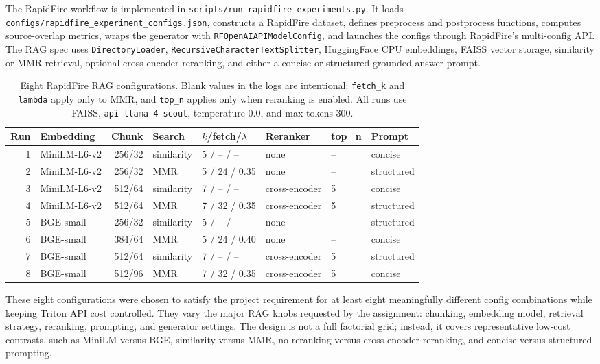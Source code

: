 \documentclass[11pt,twocolumn]{article}
\newcommand{\code}[1]{\texttt{\footnotesize #1}}
\begin{document}
The RapidFire workflow is implemented in \code{scripts/run\_rapidfire\_experiments.py}. It loads \code{configs/rapidfire\_experiment\_configs.json}, constructs a RapidFire dataset, defines preprocess and postprocess functions, computes source-overlap metrics, wraps the generator with \code{RFOpenAIAPIModelConfig}, and launches the configs through RapidFire's multi-config API. The RAG spec uses \code{DirectoryLoader}, \code{RecursiveCharacterTextSplitter}, HuggingFace CPU embeddings, FAISS vector storage, similarity or MMR retrieval, optional cross-encoder reranking, and either a concise or structured grounded-answer prompt.

\begin{table}[t]
\centering
\small
\caption{Eight RapidFire RAG configurations. Blank values in the logs are intentional: \code{fetch\_k} and \code{lambda} apply only to MMR, and \code{top\_n} applies only when reranking is enabled. All runs use FAISS, \code{api-llama-4-scout}, temperature 0.0, and max tokens 300.}
\label{tab:rapidfire-configs}
\begin{tabularx}{\textwidth}{r l r l l l l l}
\toprule
Run & Embedding & Chunk & Search & $k$/fetch/$\lambda$ & Reranker & top\_n & Prompt \\
\midrule
1 & MiniLM-L6-v2 & 256/32 & similarity & 5 / -- / -- & none & -- & concise \\
2 & MiniLM-L6-v2 & 256/32 & MMR & 5 / 24 / 0.35 & none & -- & structured \\
3 & MiniLM-L6-v2 & 512/64 & similarity & 7 / -- / -- & cross-encoder & 5 & concise \\
4 & MiniLM-L6-v2 & 512/64 & MMR & 7 / 32 / 0.35 & cross-encoder & 5 & structured \\
5 & BGE-small & 256/32 & similarity & 5 / -- / -- & none & -- & structured \\
6 & BGE-small & 384/64 & MMR & 5 / 24 / 0.40 & none & -- & concise \\
7 & BGE-small & 512/64 & similarity & 7 / -- / -- & cross-encoder & 5 & structured \\
8 & BGE-small & 512/96 & MMR & 7 / 32 / 0.35 & cross-encoder & 5 & concise \\
\bottomrule
\end{tabularx}
\end{table}

These eight configurations were chosen to satisfy the project requirement for at least eight meaningfully different config combinations while keeping Triton API cost controlled. They vary the major RAG knobs requested by the assignment: chunking, embedding model, retrieval strategy, reranking, prompting, and generator settings. The design is not a full factorial grid; instead, it covers representative low-cost contrasts, such as MiniLM versus BGE, similarity versus MMR, no reranking versus cross-encoder reranking, and concise versus structured prompting.
\end{document}
